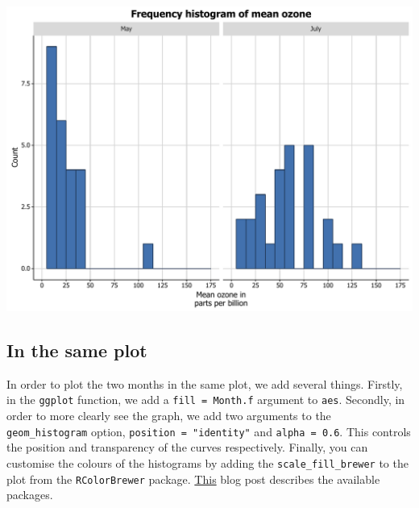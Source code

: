 \begin{center}\includegraphics[width=0.55\linewidth]{figures/histogram_18-1} \end{center}

\subsection{In the same plot}\label{in-the-same-plot}

In order to plot the two months in the same plot, we add several things.
Firstly, in the \texttt{ggplot} function, we add a
\texttt{fill\ =\ Month.f} argument to \texttt{aes}. Secondly, in order
to more clearly see the graph, we add two arguments to the
\texttt{geom\_histogram} option, \texttt{position\ =\ "identity"} and
\texttt{alpha\ =\ 0.6}. This controls the position and transparency of
the curves respectively. Finally, you can customise the colours of the
histograms by adding the \texttt{scale\_fill\_brewer} to the plot from
the \texttt{RColorBrewer} package.
\href{http://moderndata.plot.ly/create-colorful-graphs-in-r-with-rcolorbrewer-and-plotly/}{This}
blog post describes the available packages.

